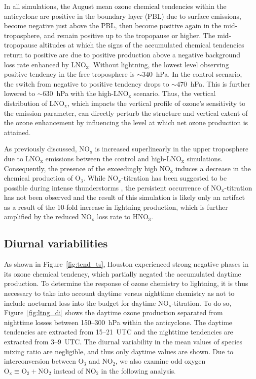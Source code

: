 In all simulations, the August mean ozone chemical tendencies within the anticyclone
are positive in the boundary layer (PBL) due to surface emissions, become negative just above
the PBL, then become positive again in the mid-troposphere, and remain
positive up to the tropopause or higher. The mid-tropopause altitudes at which the signs of the
accumulated chemical tendencies return to positive are due to positive production above a negative
background loss rate enhanced by LNO$_\mathrm{x}$. Without lightning, the
lowest level observing positive tendency in the free troposphere is $\sim340$~hPa.
In the control scenario, the switch from negative to positive tendency
drops to $\sim470$~hPa. This is further lowered to $\sim630$~hPa with the
high-LNO$_\mathrm{x}$ scenario. Thus, the vertical distribution of LNO$_\mathrm{x}$,
which impacts the vertical profile of ozone's sensitivity to the emission parameter,
can directly perturb the structure and vertical extent of the ozone enhancement
by influencing the level at which net ozone production is attained. %

As previously discussed, NO$_\mathrm{x}$ is increased superlinearly in the upper troposphere due to
LNO$_\mathrm{x}$ emissions between the control and high-$\mathrm{LNO_x}$
simulations. Consequently, the presence of the exceedingly
high NO$_\mathrm{x}$ induces a decrease in the chemical production of
O$_3$. While NO$_x$-titration has been suggested to be possible during intense
thunderstorms \citep[e.g][]{Cummings:2013vn}, the persistent occurrence
of NO$_\mathrm{x}$-titration has not been observed and the result of this simulation is likely only an
artifact as a result of the 10-fold increase in lightning production, which is
further amplified by the reduced NO$_{\mathrm{x}}$ loss rate to HNO$_3$.

\subsection{Diurnal variabilities}

As shown in Figure~\ref{fig:tend_ts}, Houston experienced strong negative phases in its ozone chemical tendency,
which partially negated the accumulated daytime production. To determine the
response of ozone chemistry to lightning, it is thus necessary to take into account
daytime versus nighttime chemistry as not to include nocturnal loss into the budget
for daytime NO$_{\mathrm{x}}$-titration. To do so, Figure~\ref{fig:ltng_di} shows the
daytime ozone production separated from nighttime losses between 150--300~hPa within
the anticyclone. The daytime tendencies are extracted from 15--21~UTC and the
nighttime tendencies are extracted from 3--9~UTC. The diurnal variability in the
mean values of species mixing ratio are negligible, and thus only daytime values
are shown. Due to interconversion between O$_3$ and NO$_2$, we also examine
odd oxygen $\mathrm{O_x\equiv O_3+NO_2}$ instead of NO$_2$ in the following
analysis.

